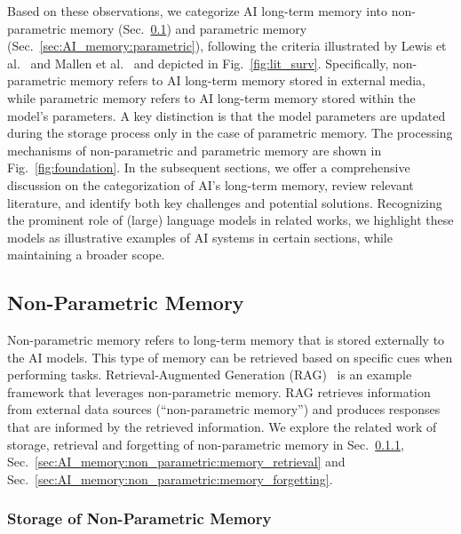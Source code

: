 \documentclass[journal,hideappendix]{vgtc}
\begin{document}
Based on these observations, we categorize AI long-term memory into non-parametric memory (Sec.~\ref{sec:AI_memory:non_parametric}) and parametric memory (Sec.~\ref{sec:AI_memory:parametric}), following the criteria illustrated by Lewis et al.~\cite{lewis2020retrieval} and Mallen et al.~\cite{mallen2023trust} and depicted in Fig.~\ref{fig:lit_surv}. Specifically, non-parametric memory refers to AI long-term memory stored in external media, while parametric memory refers to AI long-term memory stored within the model's parameters. A key distinction is that the model parameters are updated during the storage process only in the case of parametric memory. The processing mechanisms of non-parametric and parametric memory are shown in Fig.~\ref{fig:foundation}. In the subsequent sections, we offer a comprehensive discussion on the categorization of AI's long-term memory, review relevant literature, and identify both key challenges and potential solutions. 
Recognizing the prominent role of (large) language models in related works, we highlight these models as illustrative examples of AI systems in certain sections, while maintaining a broader scope.

\subsection{Non-Parametric Memory}
\label{sec:AI_memory:non_parametric}

Non-parametric memory refers to long-term memory that is stored externally to the AI models. This type of memory can be retrieved based on specific cues when performing tasks. 
Retrieval-Augmented Generation (RAG)~\cite{gao2023retrieval,zhao2024retrieval} is an example framework that leverages non-parametric memory.
RAG retrieves information from external data sources (``non-parametric memory'') and produces responses that are informed by the retrieved information.
We explore the related work of storage, retrieval and forgetting of non-parametric memory in Sec.~\ref{sec:AI_memory:non_parametric:memory_storage}, Sec.~\ref{sec:AI_memory:non_parametric:memory_retrieval} and Sec.~\ref{sec:AI_memory:non_parametric:memory_forgetting}. 


\subsubsection{Storage of Non-Parametric Memory} 
\label{sec:AI_memory:non_parametric:memory_storage}
\end{document}
